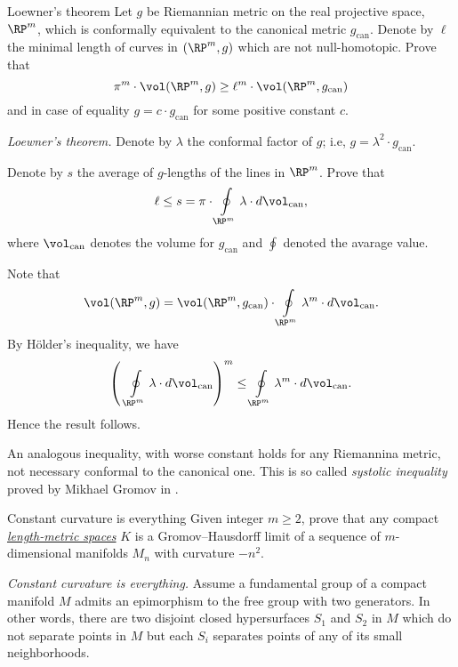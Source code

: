 \begin{pr}{}{Loewner's theorem}
\label{Loewner's theorem}
Let $g$ be Riemannian metric
on the real projective space, $\RP^m$,
which is
conformally equivalent to the canonical metric $g_{\text{can}}$.
Denote by $\ell$ the minimal length of curves in $(\RP^m,g)$ which are not null-homotopic. 
Prove that 
$$\pi^m\cdot\vol(\RP^m,g)
\ge 
\ell^m
\cdot
\vol(\RP^m,g_{\text{can}})$$ 
and in case of equality $g=c\cdot g_{\text{can}}$ for some positive constant $c$.
\end{pr}

\textit{Loewner's theorem.}
Denote by $\lambda$ the conformal factor of $g$;
i.e, $g=\lambda^2\cdot g_{\mathrm{can}}$.

Denote by $s$ the average of $g$-lengths of the lines in $\RP^m$.
Prove that 
\[\ell \le s=\pi\cdot\oint\limits_{\RP^m}\lambda\cdot d\vol_{\mathrm{can}},\]
where $\vol_{\mathrm{can}}$ denotes the volume for $g_{\mathrm{can}}$ and $\oint$ denoted the avarage value.

Note that
\[\vol(\RP^m,g)
=
\vol(\RP^m,g_{\mathrm{can}})
\cdot
\oint\limits_{\RP^m}\lambda^m\cdot d\vol_{\mathrm{can}}.\]
By H\"older's inequality, we have
\[\left(\,\,\oint\limits_{\RP^m}\lambda\cdot d\vol_{\mathrm{can}}\right)^m
\le \oint\limits_{\RP^m}\lambda^m\cdot d\vol_{\mathrm{can}}.\]
Hence the result follows.

An analogous inequality,
with worse constant holds for any Riemannina metric, 
not necessary conformal to the canonical one.
This is so called \emph{systolic inequality} proved by Mikhael Gromov in \cite{gromov-filling}.



















\begin{pr}{\thm}{Constant curvature is everything}\label{figure-eight-2} Given integer $m\ge 2$, prove that any compact \hyperref[Length-metric space]{\emph{length-metric spaces}} $K$ is a Gromov--Hausdorff limit of a sequence of $m$-dimensional
manifolds $M_n$ with curvature $-n^2$.
\end{pr}

\textit{Constant curvature is everything.}
Assume a fundamental group of a compact manifold $M$ admits an epimorphism to the free group with two generators.
In other words, there are two disjoint closed hypersurfaces $S_1$ and $S_2$ in $M$ 
which do not separate points in $M$
but each $S_i$ separates points of any of its small neighborhoods.

